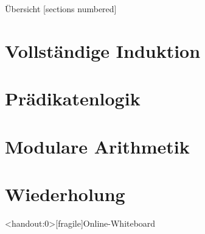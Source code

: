 %
%
%
%



\renewcommand\daynr{3}




\maketitle

\begin{frame}[fragile]{Übersicht}
	[sections numbered]
	\tableofcontents%
\end{frame}

\section{Vollständige Induktion}







\section{Prädikatenlogik}



\section{Modulare Arithmetik}


\section{Wiederholung}








\appendix

\begin{frame}<handout:0>[fragile]{Online-Whiteboard}
	\phantom{text}
\end{frame}


